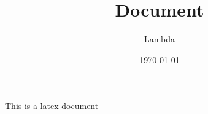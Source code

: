 \documentclass[12pt, letterpaper, twoside]{article}
\title{Document}
\author{Lambda}
\date{\today}
\begin{document}
\begin{titlepage}
\maketitle
\end{titlepage}

This is a latex document
\end{document}
